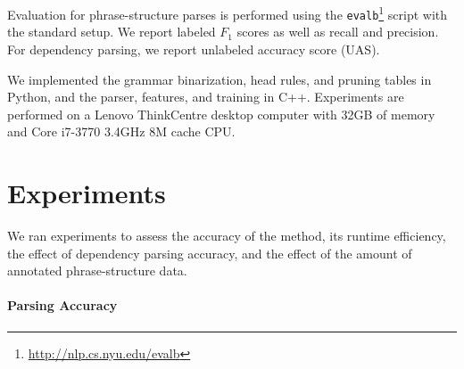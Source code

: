\documentclass[11pt,letterpaper]{article}
\DeclareMathOperator*{\argmin}{arg\,min}
\newcommand{\ParserUrl}{\url{https://github.com/ikekonglp/Converter}}
\newcommand{\lpkcomment}[1]{\textcolor{red}{\bf \small [#1 --lpk]}}
\newcommand{\nascomment}[1]{\textcolor{blue}{\bf \small [#1 --nas]}}
\begin{document}




Evaluation for phrase-structure parses is performed using the
\texttt{evalb}\footnote{\url{http://nlp.cs.nyu.edu/evalb}} script with the
standard setup. We report labeled $F_1$ scores as well as recall and
precision. For dependency parsing, we report unlabeled accuracy score
(UAS).

We implemented the grammar binarization, head rules, and pruning
tables in Python, and the parser, features, and training in C++. 
Experiments are performed on a Lenovo ThinkCentre desktop computer
with 32GB of memory and  Core i7-3770 3.4GHz 8M cache CPU.



\section{Experiments}
\label{sec:exper}

We ran experiments to assess the accuracy of the method, its runtime
efficiency, the effect of dependency parsing accuracy,
and the effect of the amount of annotated phrase-structure
data.


\paragraph{Parsing Accuracy}
\end{document}
